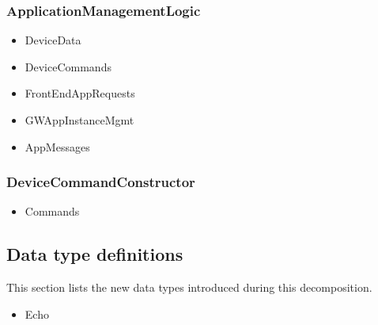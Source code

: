     \subsubsection{ApplicationManagementLogic}
        \begin{itemize}
            \item DeviceData
            \item DeviceCommands
            \item FrontEndAppRequests
            \item GWAppInstanceMgmt
            \item AppMessages
        \end{itemize}

    \subsubsection{DeviceCommandConstructor}
        \begin{itemize}
            \item Commands
        \end{itemize}



\subsection{Data type definitions}
    This section lists the new data types introduced during this decomposition.

    \begin{itemize}
        \item Echo
    \end{itemize}
